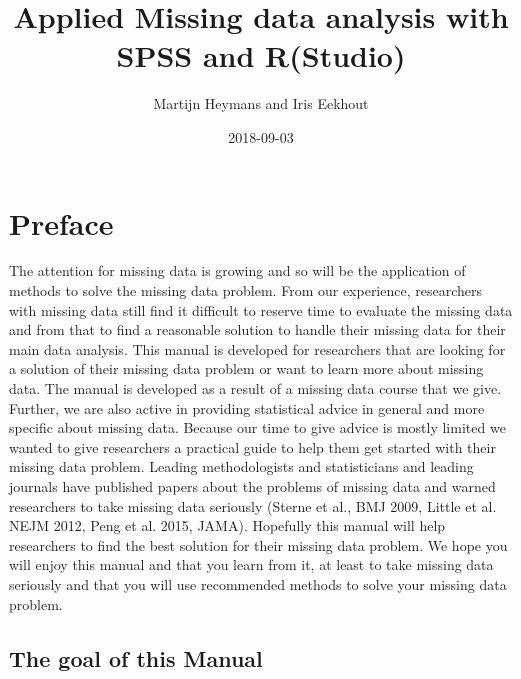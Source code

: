 \documentclass[]{book}
\title{Applied Missing data analysis with SPSS and R(Studio)}
\author{Martijn Heymans and Iris Eekhout}
\date{2018-09-03}
\theoremstyle{definition}
\theoremstyle{definition}
\theoremstyle{definition}
\theoremstyle{remark}
\begin{document}
\maketitle

{
\setcounter{tocdepth}{1}
\tableofcontents
}
\chapter*{Preface}\label{preface}

The attention for missing data is growing and so will be the application
of methods to solve the missing data problem. From our experience,
researchers with missing data still find it difficult to reserve time to
evaluate the missing data and from that to find a reasonable solution to
handle their missing data for their main data analysis. This manual is
developed for researchers that are looking for a solution of their
missing data problem or want to learn more about missing data. The
manual is developed as a result of a missing data course that we give.
Further, we are also active in providing statistical advice in general
and more specific about missing data. Because our time to give advice is
mostly limited we wanted to give researchers a practical guide to help
them get started with their missing data problem. Leading methodologists
and statisticians and leading journals have published papers about the
problems of missing data and warned researchers to take missing data
seriously (Sterne et al., BMJ 2009, Little et al. NEJM 2012, Peng et al.
2015, JAMA). Hopefully this manual will help researchers to find the
best solution for their missing data problem. We hope you will enjoy
this manual and that you learn from it, at least to take missing data
seriously and that you will use recommended methods to solve your
missing data problem.

\section{The goal of this Manual}\label{the-goal-of-this-manual}
\end{document}
